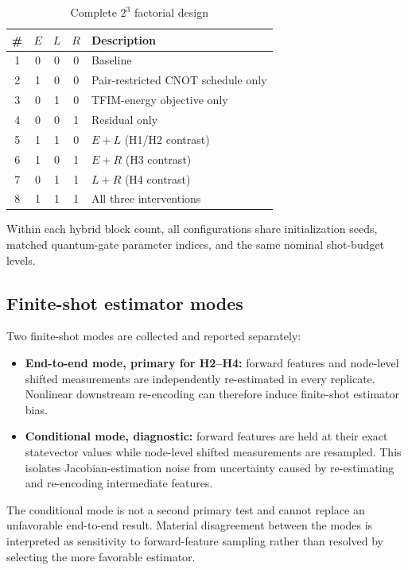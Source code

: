 \documentclass[pdflatex,sn-basic,Numbered]{sn-jnl}
\begin{document}
\begin{table}[t]
\centering
\begin{tabular}{cccc l}
\toprule
\# & $E$ & $L$ & $R$ & Description \\
\midrule
1 & 0 & 0 & 0 & Baseline \\
2 & 1 & 0 & 0 & Pair-restricted CNOT schedule only \\
3 & 0 & 1 & 0 & TFIM-energy objective only \\
4 & 0 & 0 & 1 & Residual only \\
5 & 1 & 1 & 0 & $E+L$ (H1/H2 contrast) \\
6 & 1 & 0 & 1 & $E+R$ (H3 contrast) \\
7 & 0 & 1 & 1 & $L+R$ (H4 contrast) \\
8 & 1 & 1 & 1 & All three interventions \\
\bottomrule
\end{tabular}
\caption{Complete $2^3$ factorial design}
\label{tab:configurations}
\end{table}

Within each hybrid block count, all configurations share initialization seeds, matched quantum-gate parameter indices, and the same nominal shot-budget levels.

\subsection{Finite-shot estimator modes}

Two finite-shot modes are collected and reported separately:

\begin{itemize}
\item \textbf{End-to-end mode, primary for H2--H4:} forward features and node-level shifted measurements are independently re-estimated in every replicate. Nonlinear downstream re-encoding can therefore induce finite-shot estimator bias.
\item \textbf{Conditional mode, diagnostic:} forward features are held at their exact statevector values while node-level shifted measurements are resampled. This isolates Jacobian-estimation noise from uncertainty caused by re-estimating and re-encoding intermediate features.
\end{itemize}

The conditional mode is not a second primary test and cannot replace an unfavorable end-to-end result. Material disagreement between the modes is interpreted as sensitivity to forward-feature sampling rather than resolved by selecting the more favorable estimator.
\end{document}
